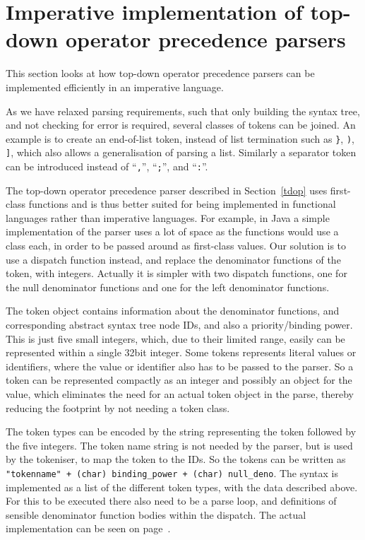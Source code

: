 \documentclass[11pt]{report}
\begin{document}
\section{Imperative implementation of top-down operator precedence parsers}
\label{tdop-imp}
This section looks at how top-down operator precedence parsers can be implemented efficiently in an imperative language.

As we have relaxed parsing requirements, such that only building the syntax tree, and not checking for error is required, several classes of tokens can be joined. An example is to create an end-of-list token, instead of list termination such as \verb|}|, \verb|)|, \verb|]|, which also allows a generalisation of parsing a list. Similarly a separator token can be introduced instead of ``\verb|,|'', ``\verb|;|'', and ``\verb|:|''.

The top-down operator precedence parser described in Section~\ref{tdop} 
uses first-class functions and is thus better suited for being implemented in functional languages rather than imperative languages.
For example, in Java a simple implementation of the parser uses a lot of space as the functions would use a class each, in order to be passed around as first-class values.
Our solution is to use a dispatch function instead, and replace the denominator functions of the token, with integers.
Actually it is simpler with two dispatch functions, one for the null denominator functions and one for the left denominator functions.

The token object contains information about the denominator functions, and corresponding abstract syntax tree node IDs, and also a priority/binding power.
This is just five small integers, which, due to their limited range, easily can be represented within a single 32bit integer. 
Some tokens represents literal values or identifiers, where the value or identifier also has to be passed to the parser.
So a token can be represented compactly as an integer and possibly an object for the value, which eliminates the need for an actual token object in the parse, thereby reducing the footprint by not needing a token class.

The token types can be encoded by the string representing the token followed by the five integers.
The token name string is not needed by the parser, but is used by the tokeniser, to map the token to the IDs.
So the tokens can be written as {\tt "tokenname" + (char) binding\_power + 
(char) null\_deno}. 
The syntax is implemented as a list of the different token types, with the data described above.
For this to be executed there also need to be a parse loop, and definitions of sensible denominator function bodies within the dispatch.
The actual implementation can be seen on page~\pageref{code-lightscript-parser}.
\end{document}
